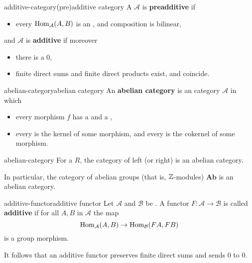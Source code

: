 \begin{topic}{additive-category}{(pre)additive category}
    A  $\mathcal{A}$ is \textbf{preadditive} if
    \begin{itemize}
        \item every $\operatorname{Hom}_\mathcal{A}(A, B)$ is an , and composition is bilinear,
    \end{itemize}
    and $\mathcal{A}$ is \textbf{additive} if moreover
    \begin{itemize}
        \item there is a  $0$,
        \item finite direct sums and finite direct products exist, and coincide.
    \end{itemize}
\end{topic}

\begin{topic}{abelian-category}{abelian category}
    An \textbf{abelian category} is an  category $\mathcal{A}$ in which
    \begin{itemize}
        \item every morphism $f$ has a  and a ,
        \item every  is the kernel of some morphism, and every  is the cokernel of some morphism.
    \end{itemize}
\end{topic}

\begin{example}{abelian-category}
    For a  $R$, the category of left (or right)  is an abelian category.
    
    In particular, the category of abelian groups (that is, $\mathbb{Z}$-modules) $\textbf{Ab}$ is an abelian category.
\end{example}

\begin{topic}{additive-functor}{additive functor}
    Let $\mathcal{A}$ and $\mathcal{B}$ be . A functor $F \colon \mathcal{A} \to \mathcal{B}$ is called \textbf{additive} if for all $A, B$ in $\mathcal{A}$ the map
    \[ \operatorname{Hom}_\mathcal{A}(A, B) \to \operatorname{Hom}_\mathcal{B}(FA, FB) \]
    is a group morphism.
    
    It follows that an additive functor preserves finite direct sums and sends $0$ to $0$.
\end{topic}

